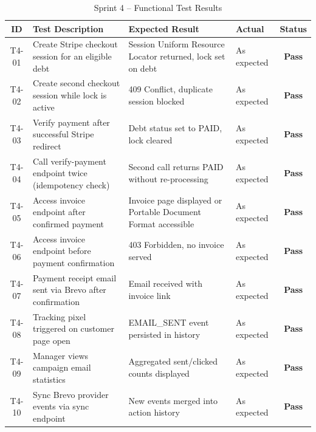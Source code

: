 \documentclass[12pt,a4paper]{report}
\newcommand{\reporttablesetup}{%
  \small%
  \setlength{\tabcolsep}{5pt}%
  \renewcommand{\arraystretch}{1.38}%
  \arrayrulecolor{framegray}%
}
\newcommand{\tpass}{\textcolor{passgreen}{\textbf{Pass}}}
\begin{document}
\begin{table}[H]
  \centering
  \renewcommand{\arraystretch}{1.3}
  \footnotesize\reporttablesetup
  \begin{tabularx}{\textwidth}{|c|Y|Y|>{\centering\arraybackslash}p{1.8cm}|c|}
    \hline
    \textbf{ID} & \textbf{Test Description} & \textbf{Expected Result} & \textbf{Actual} & \textbf{Status} \\
    \hline
    T4-01 & Create Stripe checkout session for an eligible debt       & Session Uniform Resource Locator returned, lock set on debt    & As expected & \tpass \\
    \hline
    T4-02 & Create second checkout session while lock is active       & 409 Conflict, duplicate session blocked   & As expected & \tpass \\
    \hline
    T4-03 & Verify payment after successful Stripe redirect            & Debt status set to PAID, lock cleared     & As expected & \tpass \\
    \hline
    T4-04 & Call verify-payment endpoint twice (idempotency check)    & Second call returns PAID without re-processing & As expected & \tpass \\
    \hline
    T4-05 & Access invoice endpoint after confirmed payment            & Invoice page displayed or Portable Document Format accessible  & As expected & \tpass \\
    \hline
    T4-06 & Access invoice endpoint before payment confirmation        & 403 Forbidden, no invoice served          & As expected & \tpass \\
    \hline
    T4-07 & Payment receipt email sent via Brevo after confirmation   & Email received with invoice link          & As expected & \tpass \\
    \hline
    T4-08 & Tracking pixel triggered on customer page open            & EMAIL\_SENT event persisted in history    & As expected & \tpass \\
    \hline
    T4-09 & Manager views campaign email statistics                   & Aggregated sent/clicked counts displayed  & As expected & \tpass \\
    \hline
    T4-10 & Sync Brevo provider events via sync endpoint              & New events merged into action history     & As expected & \tpass \\
    \hline
  \end{tabularx}
  \caption{Sprint 4 -- Functional Test Results}
  \label{tab:test-s4}
\end{table}
\end{document}
